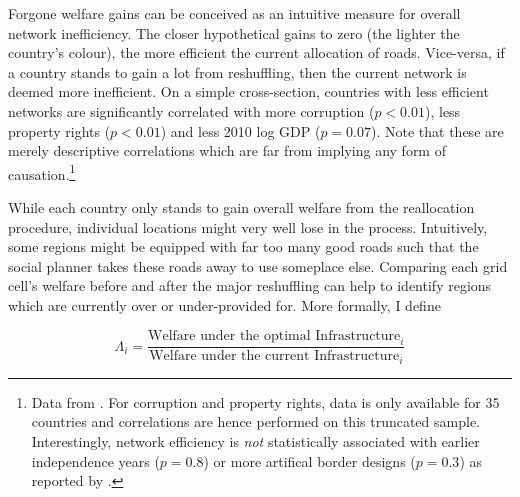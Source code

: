 \documentclass[11pt, oneside]{article}   	%
\begin{document}
Forgone welfare gains can be conceived as an intuitive measure for overall network inefficiency. The closer hypothetical gains to zero (the lighter the country's colour), the more efficient the current allocation of roads. Vice-versa, if a country stands to gain a lot from reshuffling, then the current network is deemed more inefficient. On a simple cross-section, countries with less efficient networks are significantly correlated with more corruption ($p < 0.01$), less property rights ($p < 0.01$) and less 2010 log GDP ($p=0.07$). Note that these are merely descriptive correlations which are far from implying any form of causation.\footnote{Data from \cite{the_world_bank_world_2017}. For corruption and property rights, data is only available for 35 countries and correlations are hence performed on this truncated sample. Interestingly, network efficiency is \emph{not} statistically associated with earlier independence years ($p=0.8$) or more artifical border designs ($p=0.3$) as reported by \cite{Alesina_ArtificialStates_2011}.}

While each country only stands to gain overall welfare from the reallocation procedure, individual locations might very well lose in the process. Intuitively, some regions might be equipped with far too many good roads such that the social planner takes these roads away to use someplace else. Comparing each grid cell's welfare before and after the major reshuffling can help to identify regions which are currently over or under-provided for. More formally, I define

\begin{equation}
  \Lambda_{i} = \frac{\textrm{Welfare under the optimal Infrastructure}_{i}}{\textrm{Welfare under the current Infrastructure}_{i}}
\end{equation}
\end{document}
